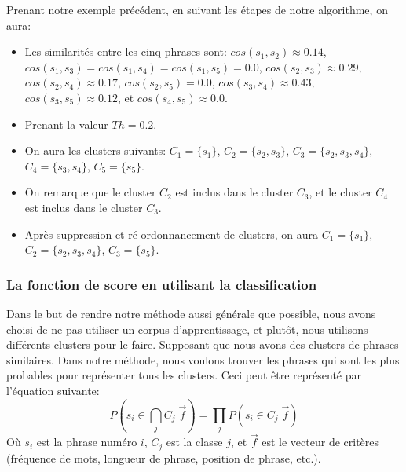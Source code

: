 \documentclass[a4paper,12pt,oneside]{../use/ESIthesis}
\begin{document}
\begin{kexp}
Prenant notre exemple précédent, en suivant les étapes de notre algorithme, on aura:
\begin{itemize}
\item Les similarités entre les cinq phrases sont: $ cos(s_1,s_2) \approx 0.14$, $ cos(s_1,s_3) = cos(s_1,s_4) = cos(s_1,s_5) =0.0 $, $ cos(s_2,s_3) \approx 0.29 $, $ cos(s_2,s_4) \approx 0.17 $, $ cos(s_2,s_5) =0.0 $, $ cos(s_3,s_4) \approx 0.43 $, $ cos(s_3,s_5) \approx 0.12 $, et $ cos(s_4,s_5) \approx 0.0 $.

\item Prenant la valeur $ Th=0.2 $.

\item On aura les clusters suivants: $ C_1 = \{s_1\} $, $ C_2 = \{s_2, s_3\} $, $ C_3 = \{s_2, s_3, s_4\} $, $ C_4 = \{s_3, s_4\} $, $ C_5 = \{s_5\} $.

\item On remarque que le cluster $ C_2 $ est inclus dans le cluster $ C_3 $, et le cluster $ C_4 $ est inclus dans le cluster $ C_3 $.

\item Après suppression et ré-ordonnancement de clusters, on aura $ C_1 = \{s_1\} $, $ C_2 = \{s_2, s_3, s_4\} $, $ C_3 = \{s_5\} $.

\end{itemize}
\end{kexp}

\subsubsection{La fonction de score en utilisant la classification}

Dans le but de rendre notre méthode aussi générale que possible, nous avons choisi de ne pas utiliser un corpus d'apprentissage, et plutôt, nous utilisons différents clusters pour le faire.
Supposant que nous avons des clusters de phrases similaires. 
Dans notre méthode, nous voulons trouver les phrases qui sont les plus probables pour représenter tous les clusters. 
Ceci peut être représenté par l'équation suivante: 
\begin{equation}
\label{eq:sent-score}
P(s_i \in \bigcap_{j} C_j | \overrightarrow{f}) = 
\prod_{j} P(s_i \in C_j | \overrightarrow{f})
\end{equation}
Où $s_i$ est la phrase numéro $i$, $C_j$ est la classe $j$, et $\overrightarrow{f}$ est le vecteur de critères (fréquence de mots, longueur de phrase, position de phrase, etc.).
\end{document}

